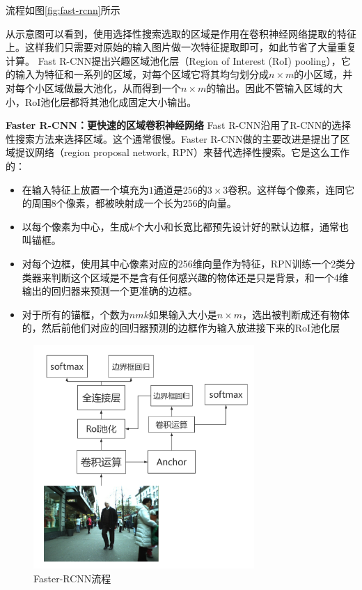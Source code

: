 \documentclass[12pt,a4paper,titlepage]{article}
\begin{document}
流程如图\ref{fig:fast-rcnn}所示

从示意图可以看到，使用选择性搜索选取的区域是作用在卷积神经网络提取的特征上。这样我们只需要对原始的输入图片做一次特征提取即可，如此节省了大量重复计算。
Fast R-CNN提出兴趣区域池化层（Region of Interest (RoI) pooling），它的输入为特征和一系列的区域，对每个区域它将其均匀划分成$n \times m$的小区域，并对每个小区域做最大池化，从而得到一个$n\times m$的输出。因此不管输入区域的大小，RoI池化层都将其池化成固定大小输出。

\textbf{Faster R-CNN：更快速的区域卷积神经网络}
Fast R-CNN沿用了R-CNN的选择性搜索方法来选择区域。这个通常很慢。Faster R-CNN做的主要改进是提出了区域提议网络（region proposal network, RPN）来替代选择性搜索。它是这么工作的：
\begin{itemize}
\item 在输入特征上放置一个$填充为1通道是256的3\times 3$卷积。这样每个像素，连同它的周围8个像素，都被映射成一个长为256的向量。
\item 以每个像素为中心，生成$k$个大小和长宽比都预先设计好的默认边框，通常也叫锚框。
\item 对每个边框，使用其中心像素对应的256维向量作为特征，RPN训练一个2类分类器来判断这个区域是不是含有任何感兴趣的物体还是只是背景，和一个4维输出的回归器来预测一个更准确的边框。
\item 对于所有的锚框，个数为$nmk$如果输入大小是$n\times m$，选出被判断成还有物体的，然后前他们对应的回归器预测的边框作为输入放进接下来的RoI池化层
\end{itemize}

\begin{figure}[h]
\centering
\includegraphics[height=8.5cm]{img/faster-rcnn.png}
\caption{Faster-RCNN流程}
\label{fig:faster-rcnn}
\end{figure}
\end{document}
